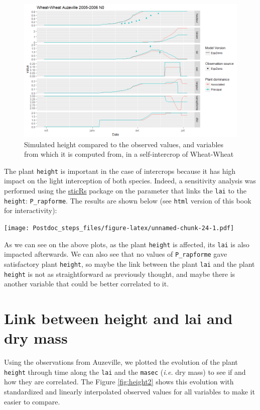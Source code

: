 \documentclass[]{book}
\begin{document}
\begin{figure}
\centering
\includegraphics{img/height1.png}
\caption{\label{fig:height1}Simulated height compared to the observed values, and variables from which it is computed from, in a self-intercrop of Wheat-Wheat}
\end{figure}

The plant \texttt{height} is important in the case of intercrops because it has high impact on the light interception of both species.
Indeed, a sensitivity analysis was performed using the \href{https://github.com/VEZY/sticRs}{sticRs} package on the parameter that links the \texttt{lai} to the \texttt{height}: \texttt{P\_rapforme}. The results are shown below (see \texttt{html} version of this book for interactivity):

\texttt{[image: Postdoc\_steps\_files/figure-latex/unnamed-chunk-24-1.pdf]}

As we can see on the above plots, as the plant \texttt{height} is affected, its \texttt{lai} is also impacted afterwards.
We can also see that no values of \texttt{P\_rapforme} gave satisfactory plant \texttt{height}, so maybe the link between the plant \texttt{lai} and the plant \texttt{height} is not as straightforward as previously thought, and maybe there is another variable that could be better correlated to it.

\hypertarget{link-between-height-and-lai-and-dry-mass}{%
\section{Link between height and lai and dry mass}\label{link-between-height-and-lai-and-dry-mass}}

Using the observations from Auzeville, we plotted the evolution of the plant \texttt{height} through time along the \texttt{lai} and the \texttt{masec} (\emph{i.e.} dry mass) to see if and how they are correlated. The Figure \ref{fig:height2} shows this evolution with standardized and linearly interpolated observed values for all variables to make it easier to compare.
\end{document}
